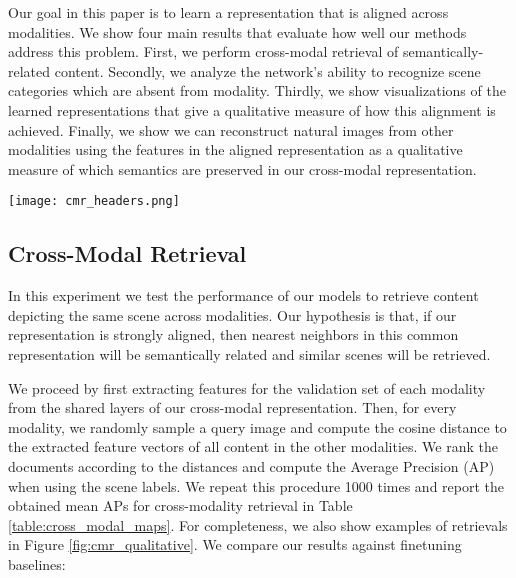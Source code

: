 \documentclass[10pt,journal,compsoc]{IEEEtran}
\begin{document}
	Our goal in this paper is to learn a representation that is aligned across modalities. We show four main results that evaluate how well our methods address this problem. First, we perform cross-modal retrieval of semantically-related content. Secondly, we analyze the network's ability to recognize scene categories which are absent from modality. Thirdly, we show visualizations of the learned representations that give a qualitative measure of how this alignment is achieved. Finally, we show we can reconstruct natural images from other modalities using the features in the aligned representation as a qualitative measure of which semantics are preserved in our cross-modal representation. 
	
	            \begin{figure*}[t]
        \begin{center}
            \texttt{[image: cmr\_headers.png]} 
        \end{center}
        \caption{\textbf{Cross-Modality Retrieval :} An example of cross-modal retrieval given a query from each of the modalities. For each row, the leftmost column depicts the query example, while the rest of the columns show the top 2 ranked results in each modalitiy.}
        \label{fig:cmr_qualitative}
    \end{figure*}

	\subsection{Cross-Modal Retrieval}
	In this experiment we test the performance of our models to retrieve content depicting the same scene across modalities. Our hypothesis is that, if our representation is strongly aligned, then nearest neighbors in this common representation will be semantically related and similar scenes will be retrieved.
	
	We proceed by first extracting features for the validation set of each modality from the shared layers of our cross-modal representation. Then, for every modality, we randomly sample a query image and compute the cosine distance to the extracted feature vectors of all content in the other modalities. We rank the documents according to the distances and compute the Average Precision (AP) when using the scene labels. We repeat this procedure 1000 times and report the obtained mean APs for cross-modality retrieval in Table \ref{table:cross_modal_maps}. For completeness, we also show examples of retrievals in Figure \ref{fig:cmr_qualitative}. We compare our results against finetuning baselines:
	
\end{document}
